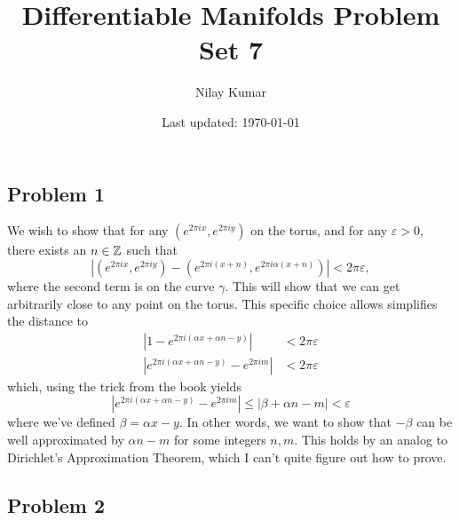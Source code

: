 \documentclass{../../mathnotes}
\title{Differentiable Manifolds Problem Set 7}
\author{Nilay Kumar}
\date{Last updated: \today}
\begin{document}
\maketitle

\subsection*{Problem 1}

We wish to show that for any $(e^{2\pi ix},e^{2\pi iy})$ on the torus, and for any $\varepsilon>0$, there exists an $n\in \mathbb{Z}$ such that
\[|(e^{2\pi ix},e^{2\pi iy})-(e^{2\pi i(x+n)},e^{2\pi i\alpha(x+n)})|<2\pi\varepsilon,\]
where the second term is on the curve $\gamma$. 
This will show that we can get arbitrarily close to any point on the torus.
This specific choice allows simplifies the distance to
\begin{align*}
    |1-e^{2\pi i(\alpha x+\alpha n-y)}|&<2\pi\varepsilon\\
    |e^{2\pi i(\alpha x+\alpha n-y)}-e^{2\pi im}|&<2\pi\varepsilon
\end{align*}
which, using the trick from the book yields
\[|e^{2\pi i(\alpha x+\alpha n-y)}-e^{2\pi im}|\leq|\beta+\alpha n-m|<\varepsilon\]
where we've defined $\beta=\alpha x-y$. In other words, we want to show that $-\beta$ can be well approximated
by $\alpha n-m$ for some integers $n,m$. This holds by an analog to Dirichlet's Approximation Theorem,
which I can't quite figure out how to prove.

\subsection*{Problem 2}
\end{document}
